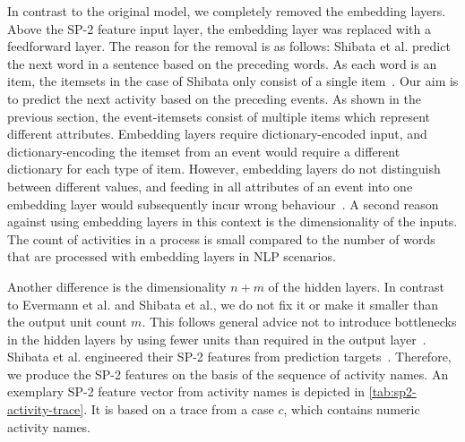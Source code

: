 In contrast to the original model, we completely removed the embedding layers.
Above the SP-2 feature input layer, the embedding layer was replaced with a feedforward layer.
The reason for the removal is as follows: Shibata et al. predict the next word in a sentence based on the preceding words.
As each word is an item, the itemsets in the case of Shibata only consist of a single item~\cite{shibata2016bipartite}.
Our aim is to predict the next activity based on the preceding events.
As shown in the previous section, the event-itemsets consist of multiple items which represent different attributes.
Embedding layers require dictionary-encoded input, and dictionary-encoding the itemset from an event would require a different dictionary for each type of item.
However, embedding layers do not distinguish between different values, and feeding in all attributes of an event into one embedding layer would subsequently incur wrong behaviour~\cite{goldberg2014word2vec}.
A second reason against using embedding layers in this context is the dimensionality of the inputs. The count of activities in a process is small compared to the number of words that are processed with embedding layers in NLP scenarios.

Another difference is the dimensionality $n+m$ of the hidden layers.
In contrast to Evermann et al. and Shibata et al., we do not fix it or make it smaller than the output unit count $m$.
This follows general advice not to introduce bottlenecks in the hidden layers by using fewer units than required in the output layer~\cite{web:techniques-in-convnets,szegedy2016rethinking}.\\

\noindent Shibata et al. engineered their SP-2 features from prediction targets~\cite{shibata2016bipartite}.
Therefore, we produce the SP-2 features on the basis of the sequence of activity names.
An exemplary SP-2 feature vector from activity names is depicted in \autoref{tab:sp2-activity-trace}.
It is based on a trace from a case $c$, which contains numeric activity names.


